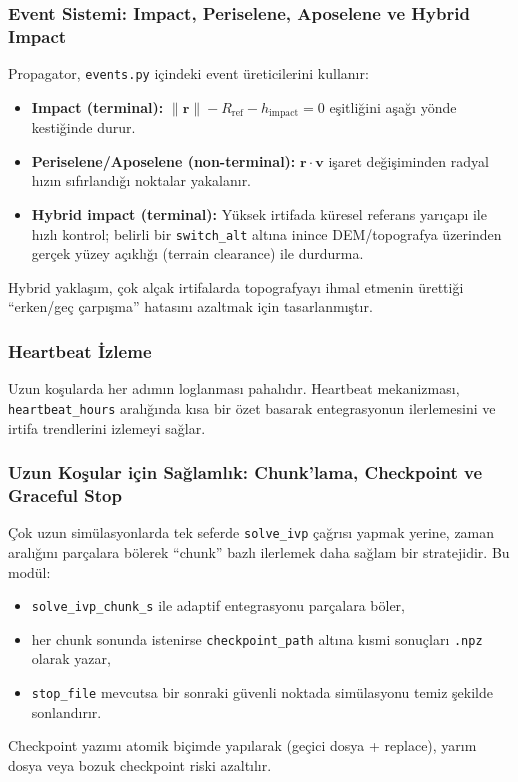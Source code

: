 \subsubsection*{Event Sistemi: Impact, Periselene, Aposelene ve Hybrid Impact}
Propagator, \texttt{events.py} içindeki event üreticilerini kullanır:
\begin{itemize}
  \item \textbf{Impact (terminal):} \(\|\mathbf r\|-R_\text{ref} - h_{\text{impact}}=0\) eşitliğini aşağı yönde kestiğinde durur.
  \item \textbf{Periselene/Aposelene (non-terminal):} \(\mathbf r\cdot\mathbf v\) işaret değişiminden radyal hızın sıfırlandığı noktalar yakalanır.
  \item \textbf{Hybrid impact (terminal):} Yüksek irtifada küresel referans yarıçapı ile hızlı kontrol;
        belirli bir \texttt{switch\_alt} altına inince DEM/topografya üzerinden gerçek yüzey açıklığı (terrain clearance) ile durdurma.
\end{itemize}
Hybrid yaklaşım, çok alçak irtifalarda topografyayı ihmal etmenin ürettiği ``erken/geç çarpışma'' hatasını azaltmak için tasarlanmıştır.

\subsubsection*{Heartbeat İzleme}
Uzun koşularda her adımın loglanması pahalıdır.
Heartbeat mekanizması, \texttt{heartbeat\_hours} aralığında kısa bir özet basarak
entegrasyonun ilerlemesini ve irtifa trendlerini izlemeyi sağlar.

\subsubsection*{Uzun Koşular için Sağlamlık: Chunk’lama, Checkpoint ve Graceful Stop}
Çok uzun simülasyonlarda tek seferde \texttt{solve\_ivp} çağrısı yapmak yerine,
zaman aralığını parçalara bölerek ``chunk'' bazlı ilerlemek daha sağlam bir stratejidir.
Bu modül:
\begin{itemize}
  \item \texttt{solve\_ivp\_chunk\_s} ile adaptif entegrasyonu parçalara böler,
  \item her chunk sonunda istenirse \texttt{checkpoint\_path} altına kısmi sonuçları \texttt{.npz} olarak yazar,
  \item \texttt{stop\_file} mevcutsa bir sonraki güvenli noktada simülasyonu temiz şekilde sonlandırır.
\end{itemize}
Checkpoint yazımı atomik biçimde yapılarak (geçici dosya + replace),
yarım dosya veya bozuk checkpoint riski azaltılır.

